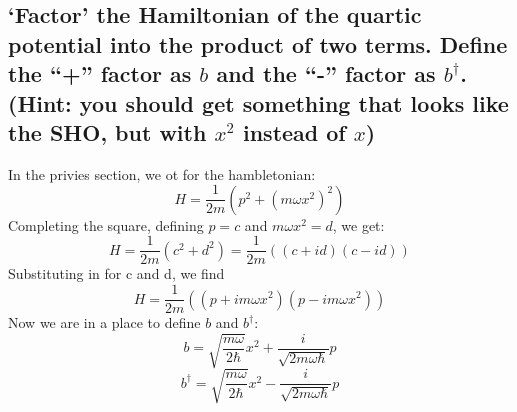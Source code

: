 \documentclass[12pt]{article}
\begin{document}
\subsection{`Factor' the Hamiltonian of the quartic potential into the product of two terms. Define the “+” factor as \( b \) and the “-” factor as \( b^\dagger \). (Hint: you should get something that looks like the SHO, but with \( x^2 \) instead of \( x \))}
In the privies section, we ot for the hambletonian:
\begin{equation}
    H = \frac{1}{2m} \left(p^{2} + \left(m \omega x^{2}\right)^{2}\right)
\end{equation}
Completing the square, defining $p=c$ and $m \omega x^{2}=d$, we get:
\begin{equation}
    H = \frac{1}{2m} \left(c^{2} + d^{2}\right) = \frac{1}{2m} \left(\left(c+id\right)\left(c-id\right)\right)
\end{equation}
Substituting in for c and d, we find
\begin{equation}
    H = \frac{1}{2m} \left(\left(p+im \omega x^{2}\right)\left(p-im \omega x^{2}\right)\right)
\end{equation}
Now we are in a place to define $b$ and $b^{\dagger}$:
\begin{equation}
    b = \sqrt{\frac{m\omega}{2\hbar}}x^2 + \frac{i}{\sqrt{2m\omega\hbar}}p
\end{equation}
\begin{equation}
    b^{\dagger} = \sqrt{\frac{m\omega}{2\hbar}}x^2 - \frac{i}{\sqrt{2m\omega\hbar}}p
\end{equation}
\end{document}
